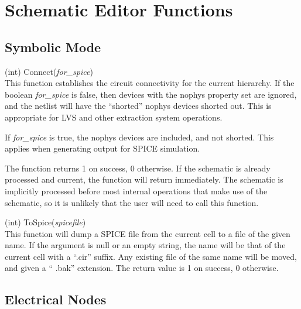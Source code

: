 \section{Schematic Editor Functions}
\subsection{Symbolic Mode}

\begin{description}
\item{(int) \vt Connect({\it for\_spice\/})}\\
This function establishes the circuit connectivity for the current
hierarchy.  If the boolean {\it for\_spice} is false, then devices
with the {\et nophys} property set are ignored, and the netlist will
have the ``shorted'' {\et nophys} devices shorted out.  This is
appropriate for LVS and other extraction system operations.

If {\it for\_spice} is true, the {\et nophys} devices are included,
and not shorted.  This applies when generating output for SPICE
simulation.

The function returns 1 on success, 0 otherwise.  If the schematic is
already processed and current, the function will return immediately. 
The schematic is implicitly processed before most internal operations
that make use of the schematic, so it is unlikely that the user will
need to call this function.

\item{(int) \vt ToSpice({\it spicefile\/})}\\
This function will dump a SPICE file from the current cell to a file
of the given name.  If the argument is null or an empty string, the
name will be that of the current cell with a ``{\vt .cir}'' suffix. 
Any existing file of the same name will be moved, and given a ``{\vt
.bak}'' extension.  The return value is 1 on success, 0 otherwise.

\end{description}

\subsection{Electrical Nodes}


